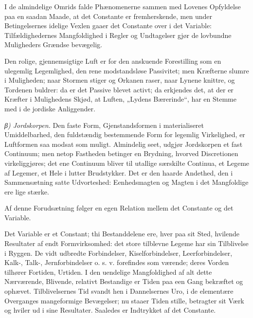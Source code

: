 \documentclass[12pt,a4paper]{book}
\newcommand{\subrunin}[1]{\emph{#1}\hspace{0.4em}}
\begin{document}
I de almindelige Omrids falde Phænomenerne sammen med Lovenes Opfyldelse
paa en saadan Maade, at det Constante er fremherskende, men under
Betingelsernes idelige Vexlen gaaer det Constante over i det Variable:
Tilfældighedernes Mangfoldighed i Regler og Undtagelser gjør de
lovbundne Muligheders Grændse bevægelig.

Den rolige, gjennemsigtige Luft er for den anskuende Forestilling som en
ulegemlig Legemlighed, den rene modstandsløse Passivitet; men Kræfterne
slumre i Muligheden; naar Stormen stiger og Orkanen raser, naar Lynene
knittre, og Tordenen buldrer: da er det Passive blevet activt; da
erkjendes det, at der er Kræfter i Mulighedens Skjød, at Luften,
„Lydens Bærerinde“, har en Stemme med i de jordiske Anliggender.

\subrunin{β) Jordskorpen.} Den faste Form, Gjenstandsformen i
materialiseret Umiddelbarhed, den fuldstændig bestemmende Form for
legemlig Virkelighed, er Luftformen saa modsat som muligt. Almindelig
seet, udgjør Jordskorpen et fast Continuum; men netop Fastheden betinger
en Brydning, hvorved Discretionen virkeliggjøres; det ene Continuum
bliver til utallige særskilte Continua, et Legeme af Legemer, et Hele i
lutter Brudstykker. Det er den haarde Andethed, den i Sammensætning satte
Udvorteshed: Eenhedsmagten og Magten i det Mangfoldige ere lige stærke.

Af denne Forudsætning følger en egen Relation mellem det Constante og det
Variable.

Det Variable er et Constant; thi Bestanddelene ere, hver paa sit Sted,
hvilende Resultater af endt Formvirksomhed: det store tilblevne Legeme
har sin Tilblivelse i Ryggen.
De vidt udbredte Forbindelser, Kiselforbindelser, Leerforbindelser,
Kalk-, Talk-, Jernforbindelser o. s. v. forefindes som værende; deres
Vorden tilhører Fortiden, Urtiden. I den uendelige Mangfoldighed af alt
dette Nærværende, Blivende, relativt Bestandige er Tiden paa een Gang
bekræftet og ophævet. Tilblivelsernes Tid svandt hen i Dannelsernes Uro,
i de elementære Overganges mangeformige Bevægelser; nu staaer Tiden
stille, betragter sit Værk og hviler ud i sine Resultater. Saaledes er
Indtrykket af det Constante.
\end{document}
